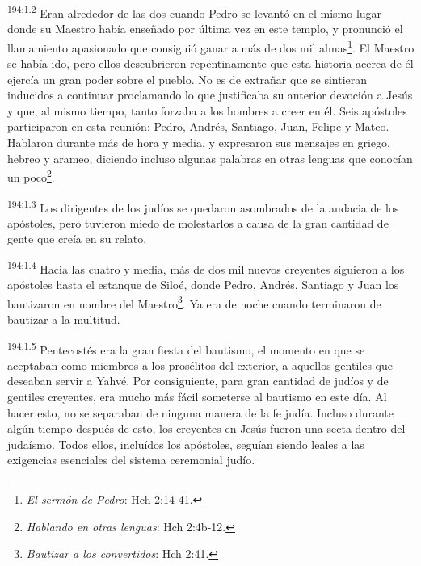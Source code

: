 \par
\textsuperscript{194:1.2} Eran alrededor de las dos cuando Pedro se levantó en el mismo lugar donde su Maestro había enseñado por última vez en este templo, y pronunció el llamamiento apasionado que consiguió ganar a más de dos mil almas\footnote{\textit{El sermón de Pedro}: Hch 2:14-41.}. El Maestro se había ido, pero ellos descubrieron repentinamente que esta historia acerca de él ejercía un gran poder sobre el pueblo. No es de extrañar que se sintieran inducidos a continuar proclamando lo que justificaba su anterior devoción a Jesús y que, al mismo tiempo, tanto forzaba a los hombres a creer en él. Seis apóstoles participaron en esta reunión: Pedro, Andrés, Santiago, Juan, Felipe y Mateo. Hablaron durante más de hora y media, y expresaron sus mensajes en griego, hebreo y arameo, diciendo incluso algunas palabras en otras lenguas que conocían un poco\footnote{\textit{Hablando en otras lenguas}: Hch 2:4b-12.}.

\par
\textsuperscript{194:1.3} Los dirigentes de los judíos se quedaron asombrados de la audacia de los apóstoles, pero tuvieron miedo de molestarlos a causa de la gran cantidad de gente que creía en su relato.

\par
\textsuperscript{194:1.4} Hacia las cuatro y media, más de dos mil nuevos creyentes siguieron a los apóstoles hasta el estanque de Siloé, donde Pedro, Andrés, Santiago y Juan los bautizaron en nombre del Maestro\footnote{\textit{Bautizar a los convertidos}: Hch 2:41.}. Ya era de noche cuando terminaron de bautizar a la multitud.

\par
\textsuperscript{194:1.5} Pentecostés era la gran fiesta del bautismo, el momento en que se aceptaban como miembros a los prosélitos del exterior, a aquellos gentiles que deseaban servir a Yahvé. Por consiguiente, para gran cantidad de judíos y de gentiles creyentes, era mucho más fácil someterse al bautismo en este día. Al hacer esto, no se separaban de ninguna manera de la fe judía. Incluso durante algún tiempo después de esto, los creyentes en Jesús fueron una secta dentro del judaísmo. Todos ellos, incluídos los apóstoles, seguían siendo leales a las exigencias esenciales del sistema ceremonial judío.

